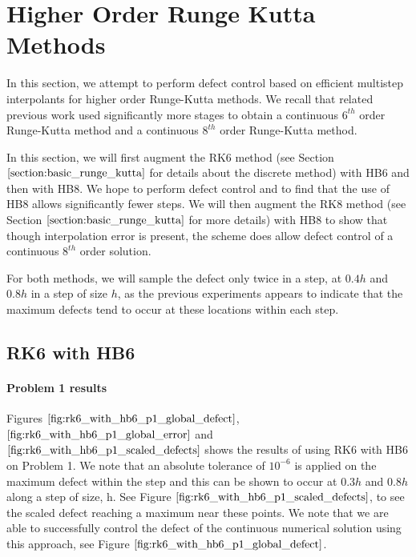 
\section{Higher Order Runge Kutta Methods}
\label{section:HBs_and_higher_order_RK}
In this section, we attempt to perform defect control based on efficient multistep interpolants for higher order Runge-Kutta methods. We recall that related previous work used significantly more stages to obtain a continuous $6^{th}$ order Runge-Kutta method and a continuous $8^{th}$ order Runge-Kutta method.

In this section, we will first augment the RK6 method (see Section $\ref{section:basic_runge_kutta}$ for details about the discrete method) with HB6 and then with HB8. We hope to perform defect control and to find that the use of HB8 allows significantly fewer steps. We will then augment the RK8 method (see Section $\ref{section:basic_runge_kutta}$ for more details) with HB8 to show that though interpolation error is present, the scheme does allow defect control of a continuous $8^{th}$ order solution. 

For both methods, we will sample the defect only twice in a step, at $0.4h$ and $0.8h$ in a step of size $h$, as the previous experiments appears to indicate that the maximum defects tend to occur at these locations within each step.

\subsection{RK6 with HB6}
\paragraph{Problem 1 results}
Figures $\ref{fig:rk6_with_hb6_p1_global_defect}$, $\ref{fig:rk6_with_hb6_p1_global_error}$ and $\ref{fig:rk6_with_hb6_p1_scaled_defects}$ shows the results of using RK6 with HB6 on Problem 1. We note that an absolute tolerance of $10^{-6}$ is applied on the maximum defect within the step and this can be shown to occur at $0.3h$ and $0.8h$ along a step of size, h. See Figure $\ref{fig:rk6_with_hb6_p1_scaled_defects}$, to see the scaled defect reaching a maximum near these points. We note that we are able to successfully control the defect of the continuous numerical solution using this approach, see Figure $\ref{fig:rk6_with_hb6_p1_global_defect}$. 

